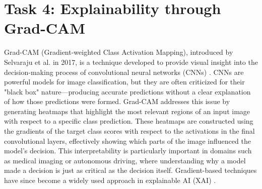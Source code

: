 \documentclass[conference]{IEEEtran}
\begin{document}




\section{Task 4: Explainability through Grad-CAM}\label{sec:task_4}

Grad-CAM (Gradient-weighted Class Activation Mapping), introduced by Selvaraju et al. in 2017, is a technique developed to provide visual insight into the decision-making process of convolutional neural networks (CNNs) \cite{Grad-CAM}. CNNs are powerful models for image classification, but they are often criticized for their "black box" nature—producing accurate predictions without a clear explanation of how those predictions were formed. Grad-CAM addresses this issue by generating heatmaps that highlight the most relevant regions of an input image with respect to a specific class prediction. These heatmaps are constructed using the gradients of the target class scores with respect to the activations in the final convolutional layers, effectively showing which parts of the image influenced the model’s decision.
This interpretability is particularly important in domains such as medical imaging or autonomous driving, where understanding why a model made a decision is just as critical as the decision itself. Gradient-based techniques have since become a widely used approach in explainable AI (XAI) \cite{XAI}. 
\end{document}
